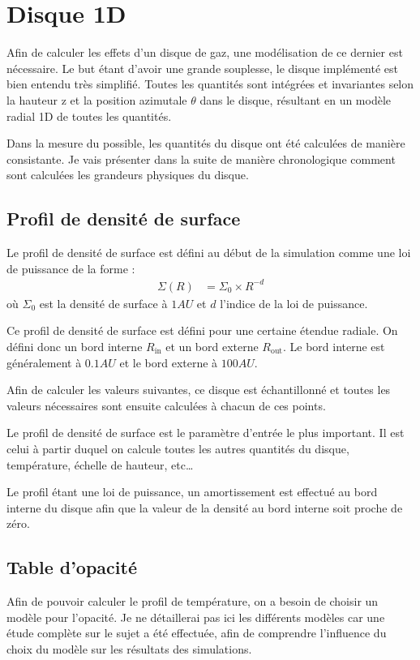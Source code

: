 
\section{Disque 1D}
Afin de calculer les effets d'un disque de gaz, une modélisation de ce dernier est nécessaire. Le but étant d'avoir une grande souplesse, le disque implémenté est bien entendu très simplifié. Toutes les quantités sont intégrées et invariantes selon la hauteur z et la position azimutale $\theta$ dans le disque, résultant en un modèle radial 1D de toutes les quantités. 

Dans la mesure du possible, les quantités du disque ont été calculées de manière consistante. Je vais présenter dans la suite de manière chronologique comment sont calculées les grandeurs physiques du disque.

\subsection{Profil de densité de surface}
Le profil de densité de surface est défini au début de la simulation comme une loi de puissance de la forme :
\begin{align}
\Sigma(R) &= \Sigma_0 \times R^{-d}
\end{align}
où $\Sigma_0$ est la densité de surface à $1\unit{AU}$ et $d$ l'indice de la loi de puissance. 

Ce profil de densité de surface est défini pour une certaine étendue radiale. On défini donc un bord interne $R_\text{in}$ et un bord externe $R_\text{out}$. Le bord interne est généralement à $0.1\unit{AU}$ et le bord externe à $100\unit{AU}$. 

Afin de calculer les valeurs suivantes, ce disque est échantillonné et toutes les valeurs nécessaires sont ensuite calculées à chacun de ces points. 

\bigskip

Le profil de densité de surface est le paramètre d'entrée le plus important. Il est celui à partir duquel on calcule toutes les autres quantités du disque, température, échelle de hauteur, etc\dots

Le profil étant une loi de puissance, un amortissement est effectué au bord interne du disque afin que la valeur de la densité au bord interne soit proche de zéro. 


\subsection{Table d'opacité}
Afin de pouvoir calculer le profil de température, on a besoin de choisir un modèle pour l'opacité. Je ne détaillerai pas ici les différents modèles car une étude complète sur le sujet a été effectuée, afin de comprendre l'influence du choix du modèle sur les résultats des simulations. 

